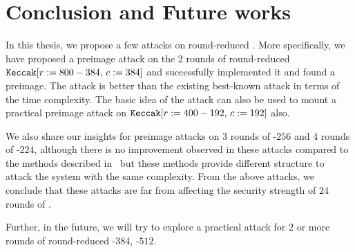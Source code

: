 
\section{Conclusion and Future works}
In this thesis, we propose a few attacks on round-reduced \KECCAK{}.
More specifically, we have proposed a preimage attack on the $2$ rounds of round-reduced $\mbox{\texttt{Keccak}}[r:=800-384,\,c:=384]$ and successfully implemented it and found a preimage. The attack is better than the existing best-known attack in terms of the time complexity. The basic idea of the attack can also be used to mount a practical preimage attack on $\mbox{\texttt{Keccak}}[r:=400-192,\, c:=192]$ also.
 
We also share our insights for preimage attacks on $3$ rounds of \Keccak{}-$256$ and $4$ rounds of \Keccak-$224$, although there is no improvement observed in these attacks compared to the methods described in~\cite{guo2016linear} but these methods provide different structure to attack the system with the same complexity.
From the above attacks, we conclude that these attacks are far from affecting the security strength of $24$ rounds of \Keccak{}.

Further, in the future, we will try to explore a practical attack for $2$ or more rounds of round-reduced \KECCAK-$384$, \KECCAK-$512$.
